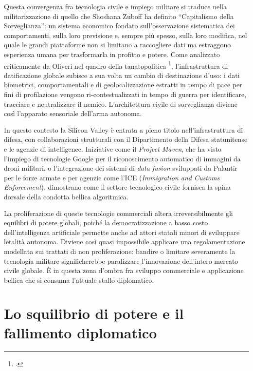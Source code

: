 \ifstampa\documentclass[a4paper,12pt,twoside,openright]{report}\else\documentclass[a4paper,12pt]{report}\fi
\newif\ifrevisione \revisionefalse
\DeclareRobustCommand{\rev}[1]{\ifrevisione{\color{blue!65!black}#1}\else#1\fi}
\begin{document}
Questa convergenza fra tecnologia civile e impiego militare si traduce nella militarizzazione di quello che Shoshana Zuboff ha definito ``Capitalismo della Sorveglianza'': un sistema economico
fondato sull'osservazione sistematica dei comportamenti, sulla loro previsione
e, sempre più spesso, sulla loro modifica, nel quale le grandi piattaforme non
si limitano a raccogliere dati ma estraggono esperienza umana per trasformarla
in profitto e potere. Come analizzato criticamente da Oliveri nel quadro della
tanatopolitica \footcite{oliveri_2024}, l'infrastruttura di datificazione
globale subisce a sua volta un cambio di destinazione d'uso: i dati biometrici,
comportamentali e di geolocalizzazione estratti in tempo di pace per fini di
profilazione vengono ri-contestualizzati in tempo di guerra per identificare,
tracciare e neutralizzare il nemico. L'architettura civile di sorveglianza
diviene così l'apparato sensoriale dell'arma autonoma.
 
In questo contesto la Silicon Valley è entrata a pieno titolo
nell'infrastruttura di difesa, con collaborazioni strutturali con il
Dipartimento della Difesa statunitense e le agenzie di intelligence. Iniziative
come il \textit{Project Maven}, che ha visto l'impiego di tecnologie Google per
il riconoscimento automatico di immagini da droni militari, o l'integrazione dei
sistemi di \textit{data fusion} sviluppati da Palantir per le forze armate e per
agenzie come l'ICE \rev{(\textit{Immigration and Customs Enforcement})}, dimostrano come il settore tecnologico civile fornisca la
spina dorsale della condotta bellica algoritmica.
 
La proliferazione di queste tecnologie commerciali altera irreversibilmente gli
equilibri di potere globali, poiché la democratizzazione a basso costo
dell'intelligenza artificiale permette anche ad attori statali minori di
sviluppare letalità autonoma. Diviene così quasi
impossibile applicare una regolamentazione modellata sui trattati di non
proliferazione: bandire o limitare severamente la tecnologia militare
significherebbe paralizzare l'innovazione dell'intero mercato civile globale. È
in questa zona d'ombra fra sviluppo commerciale e applicazione bellica che si
consuma l'attuale stallo diplomatico.
 
\section{Lo squilibrio di potere e il fallimento diplomatico}
 
\end{document}
